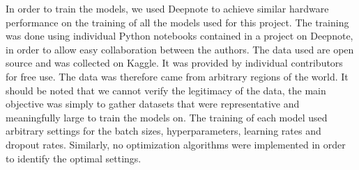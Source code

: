 In order to train the models, we used Deepnote\cite{deepnote} to achieve similar hardware performance on the training of all the models used for this project. 
The training was done using individual Python notebooks contained in a project on Deepnote, in order to allow easy collaboration between the authors.
The data used are open source and was collected on Kaggle. It was provided by individual contributors for free use.
The data was therefore came from arbitrary regions of the world. 
It should be noted that we cannot verify the legitimacy of the data, the main objective was simply to gather datasets that were representative and meaningfully large to train the models on. 
The training of each model used arbitrary settings for the batch sizes, hyperparameters, learning rates and dropout rates. Similarly, no optimization algorithms were implemented in order to identify the optimal settings. 